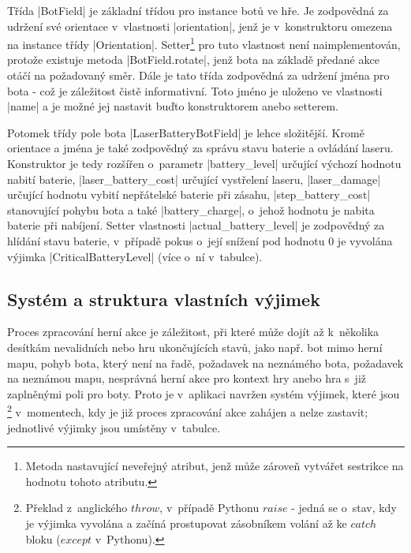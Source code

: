 Třída \ic|BotField| je základní třídou pro instance botů ve hře. Je zodpovědná za udržení své orientace v~vlastnosti \ic|orientation|, jenž je v~konstruktoru omezena na instance třídy \ic|Orientation|. Setter\footnote{Metoda nastavující neveřejný atribut, jenž může zároveň vytvářet sestrikce na hodnotu tohoto atributu.} pro tuto vlastnost není naimplementován, protože existuje metoda \ic|BotField.rotate|, jenž bota na základě předané akce otáčí na požadovaný směr. Dále je tato třída zodpovědná za udržení jména pro bota - což je záležitost čistě informativní. Toto jméno je uloženo ve vlastnosti \ic|name| a je možné jej nastavit buďto konstruktorem anebo setterem.

\begin{sloppypar}
    Potomek třídy pole bota \ic|LaserBatteryBotField| je lehce složitější. Kromě orientace a jména je také zodpovědný za správu stavu baterie a ovládání laseru. Konstruktor je tedy rozšířen o~parametr \ic|battery_level| určující výchozí hodnotu nabití baterie, \ic|laser_battery_cost| určující  vystřelení laseru, \ic|laser_damage| určující hodnotu vybití nepřátelské baterie při zásahu, \ic|step_battery_cost| stanovující  pohybu bota a také \ic|battery_charge|, o~jehož hodnotu je nabita baterie při nabíjení. Setter vlastnosti \ic|actual_battery_level| je zodpovědný za hlídání stavu baterie, v~případě pokus o~její snížení pod hodnotu $0$ je vyvolána výjimka \ic|CriticalBatteryLevel| (více o~ní v~tabulce).
\end{sloppypar}

\subsection{Systém a struktura vlastních výjimek}
\label{subsec:custom-exceptions}

Proces zpracování herní akce je záležitost, při které může dojít až k~několika desítkám nevalidních nebo hru ukončujících stavů, jako např. bot mimo herní mapu, pohyb bota, který není na řadě, požadavek na neznámého bota, požadavek na neznámou mapu, nesprávná herní akce pro kontext hry anebo hra s~již zaplněnými poli pro boty. Proto je v~aplikaci navržen systém výjimek, které jsou \footnote{Překlad z~anglického $throw$, v~případě Pythonu $raise$ - jedná se o~stav, kdy je výjimka vyvolána a začíná prostupovat zásobníkem volání až ke $catch$ bloku ($except$ v~Pythonu).} v~momentech, kdy je již proces zpracování akce zahájen a nelze zastavit; jednotlivé výjimky jsou umístěny v~tabulce.

